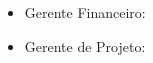 \begin{itemize}
\item{Gerente Financeiro:
\newline
     \Patrocinador}
\item{Gerente de Projeto:
\newline
     \Gerente}
\end{itemize}
